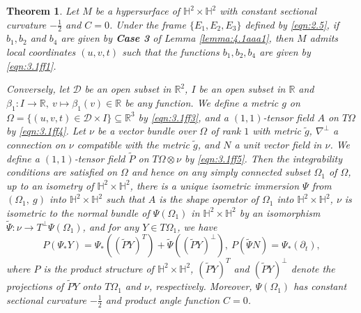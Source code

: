 \documentclass[reqno]{amsart}%
\newtheorem{theorem}{Theorem}[section]   %
\theoremstyle{definition}
\numberwithin{equation}{section}
\begin{document}
\begin{theorem}\label{thm:5.10a1}
Let $M$ be a hypersurface of $\mathbb{H}^2\times \mathbb{H}^2$ with constant sectional curvature $-\frac{1}{2}$ and $C=0$.
Under the frame $\{E_1,E_2,E_3\}$ defined by \eqref{eqn:2.5}, if $b_1,b_2$ and $b_4$ are
given by {\bf Case 3} of Lemma \ref{lemma:4.1aaa1}, then $M$ admits local coordinates $(u,v,t)$
such that the functions $b_1,b_2,b_4$ are given by \eqref{eqn:3.1ff1}.



Conversely, let $\mathcal{D}$ be an open subset in $\mathbb{R}^2$, $I$ be an open subset in $\mathbb{R}$ and $\beta_1:I\to\mathbb{R},\  v\mapsto \beta_1(v)\in\mathbb{R}$ be any function. We define a metric $g$ on $\Omega=\{(u,v,t)\in \mathcal{D}\times I\}\subseteq \mathbb{R}^3$ by
\eqref{eqn:3.1ff3}, and a $(1,1)$-tensor field $A$ on $T\Omega$ by
\eqref{eqn:3.1ff4}.
Let $\nu$ be a vector bundle over  $\Omega$ of rank $1$ with metric $\tilde{g}$, $\nabla ^{\perp} $ a connection on $\nu$ compatible with the metric $\tilde{g}$, and $N$ a unit vector field in $\nu$.   We define a $(1,1)$-tensor field $\tilde{P}$ on $T\Omega\otimes \nu$ by
\eqref{eqn:3.1ff5}.
Then the integrability conditions are satisfied on $\Omega$ and hence on any simply
connected subset $\Omega_1$ of $\Omega$, up to an isometry of  $\mathbb{H}^2\times \mathbb{H}^2$, there is a unique isometric immersion $\Psi$ from $(\Omega_1,~g)$ into $\mathbb{H}^2\times \mathbb{H}^2$ such that $A$ is the shape operator of  $\Omega_1$ into $\mathbb{H}^2\times \mathbb{H}^2$, $\nu$ is isometric to the normal bundle of $\Psi(\Omega_1)$ in
$\mathbb{H}^2\times \mathbb{H}^2$ by an isomorphism $\tilde{\Psi}:\nu\to T^{\perp}\Psi(\Omega_1)$,
and for any $Y\in T\Omega_1$, we have
\begin{equation}
	P(\Psi_{*}Y)=\Psi_{*}((\tilde{P}Y)^{T})+\tilde{\Psi}((\tilde{P}Y)^{\perp}),~
	P(\tilde{\Psi}N)=\Psi_*(\partial_t),
\end{equation}
where $P$ is the product structure of $\mathbb{H}^2\times \mathbb{H}^2$, $(\tilde{P}Y)^{T}$ and $(\tilde{P}Y)^{\perp}$ denote the projections of  $\tilde{P}Y$ onto $T\Omega_1$ and $\nu$, respectively.
Moreover, $\Psi(\Omega_1)$ has constant sectional curvature $-\frac{1}{2}$ and product angle function $C=0$.
\end{theorem}
%
\end{document}
